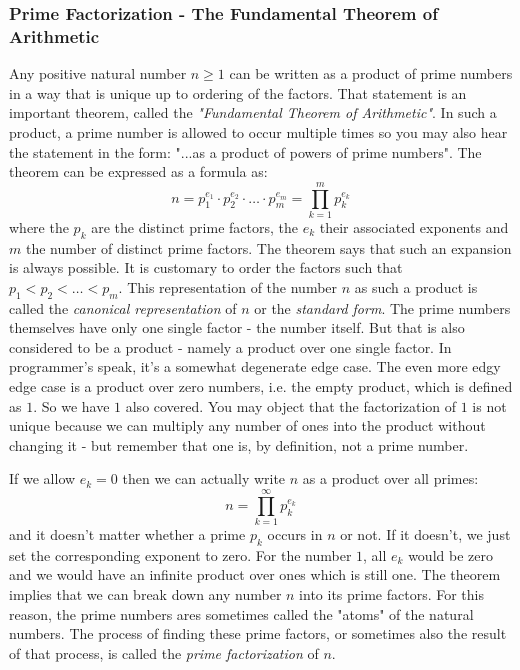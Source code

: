\subsubsection{Prime Factorization - The Fundamental Theorem of Arithmetic}
Any positive natural number $n \geq 1$ can be written as a product of prime numbers in a way that is unique up to ordering of the factors. That statement is an important theorem, called the \emph{"Fundamental Theorem of Arithmetic"}. In such a product, a prime number is allowed to occur multiple times so you may also hear the statement in the form: "...as a product of powers of prime numbers". The theorem can be expressed as a formula as:
\begin{equation}
 n = p_1^{e_1} \cdot p_2^{e_2} \cdot \ldots \cdot p_m^{e_m}
   = \prod_{k=1}^{m} p_k^{e_k}
\end{equation}
where the $p_k$ are the distinct prime factors, the $e_k$ their associated exponents and $m$ the number of distinct prime factors. The theorem says that such an expansion is always possible. It is customary to order the factors such that $p_1 < p_2 < \ldots < p_m$. This representation of the number $n$ as such a product is called the \emph{canonical representation} of $n$ or the \emph{standard form}. The prime numbers themselves have only one single factor - the number itself. But that is also considered to be a product - namely a product over one single factor. In programmer's speak, it's a somewhat degenerate edge case. The even more edgy edge case is a product over zero numbers, i.e. the empty product, which is defined as $1$. So we have $1$ also covered. You may object that the factorization of $1$ is not unique because we can multiply any number of ones into the product without changing it - but remember that one is, by definition, not a prime number. 

\medskip
If we allow $e_k = 0$ then we can actually write $n$ as a product over all primes:
\begin{equation}
 n = \prod_{k=1}^{\infty} p_k^{e_k}
\end{equation}
and it doesn't matter whether a prime $p_k$ occurs in $n$ or not. If it doesn't, we just set the corresponding exponent to zero. For the number $1$, all $e_k$ would be zero and we would have an infinite product over ones which is still one. The theorem implies that we can break down any number $n$ into its prime factors. For this reason, the prime numbers ares sometimes called the "atoms" of the natural numbers. The process of finding these prime factors, or sometimes also the result of that process, is called the \emph{prime factorization} of $n$.

